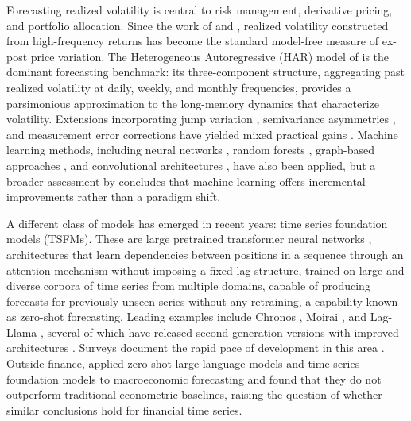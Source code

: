 \documentclass[12pt]{article}
\begin{document}
Forecasting realized volatility is central to risk management, derivative pricing, and portfolio allocation. Since the work of \citet{andersen1998} and \citet{barndorffnielsen2002}, realized volatility constructed from high-frequency returns has become the standard model-free measure of ex-post price variation. The Heterogeneous Autoregressive (HAR) model of \citet{corsi2009} is the dominant forecasting benchmark: its three-component structure, aggregating past realized volatility at daily, weekly, and monthly frequencies, provides a parsimonious approximation to the long-memory dynamics that characterize volatility. Extensions incorporating jump variation \citep{andersen2007roughing}, semivariance asymmetries \citep{patton2015}, and measurement error corrections \citep{bollerslev2016harq} have yielded mixed practical gains \citep{clements2021practical, branco2024}. Machine learning methods, including neural networks \citep{bucci2020}, random forests \citep{luong2018}, graph-based approaches \citep{zhang2024intraday, zhang2025graph, brini2025spotv2net}, and convolutional architectures \citep{morenopino2024deepvol}, have also been applied, but a broader assessment by \citet{christensen2023ml} concludes that machine learning offers incremental improvements rather than a paradigm shift.

A different class of models has emerged in recent years: time series foundation models (TSFMs). These are large pretrained transformer neural networks \citep{vaswani2017}, architectures that learn dependencies between positions in a sequence through an attention mechanism without imposing a fixed lag structure, trained on large and diverse corpora of time series from multiple domains, capable of producing forecasts for previously unseen series without any retraining, a capability known as zero-shot forecasting. Leading examples include Chronos \citep{ansari2024chronos}, Moirai \citep{woo2024moirai}, and Lag-Llama \citep{rasul2024lagllama}, several of which have released second-generation versions with improved architectures \citep{ansari2025chronos2, liu2025moirai2}. Surveys document the rapid pace of development in this area \citep{liang2024tsfmsurvey, ye2024tsfmsurvey, miller2024tsfmsurvey}. Outside finance, \citet{carriero2024macro} applied zero-shot large language models and time series foundation models to macroeconomic forecasting and found that they do not outperform traditional econometric baselines, raising the question of whether similar conclusions hold for financial time series.
\end{document}
